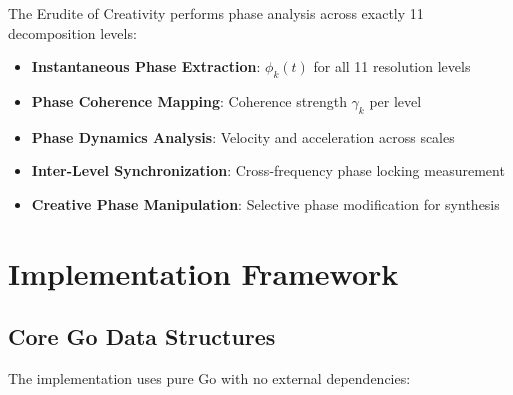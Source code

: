 The Erudite of Creativity performs phase analysis across exactly 11 decomposition levels:
\begin{itemize}
    \item \textbf{Instantaneous Phase Extraction}: $\phi_k(t)$ for all 11 resolution levels
    \item \textbf{Phase Coherence Mapping}: Coherence strength $\gamma_k$ per level
    \item \textbf{Phase Dynamics Analysis}: Velocity and acceleration across scales
    \item \textbf{Inter-Level Synchronization}: Cross-frequency phase locking measurement
    \item \textbf{Creative Phase Manipulation}: Selective phase modification for synthesis
\end{itemize}

\section{Implementation Framework}

\subsection{Core Go Data Structures}

The implementation uses pure Go with no external dependencies:

